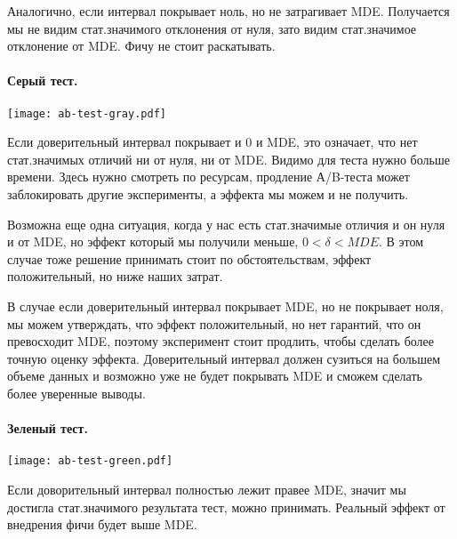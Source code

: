 \documentclass[../handbook.tex]{subfiles}
\begin{document}
Аналогично, если интервал покрывает ноль, но не затрагивает MDE. Получается мы
не видим стат.значимого отклонения от нуля, зато видим стат.значимое отклонение
от MDE. Фичу не стоит раскатывать.

\paragraph{Серый тест.}
\begin{marginfigure}
    \texttt{[image: ab-test-gray.pdf]}
\end{marginfigure}
Если доверительный интервал покрывает и 0 и MDE, это означает, что нет
стат.значимых отличий ни от нуля, ни от MDE. Видимо для теста нужно больше
времени. Здесь нужно смотреть по ресурсам, продление А/B-теста может
заблокировать другие эксперименты, а эффекта мы можем и не получить.

Возможна еще одна ситуация, когда у нас есть стат.значимые отличия и он нуля и
от MDE, но эффект который мы получили меньше, $0 < \delta < MDE$. В этом случае
тоже решение принимать стоит по обстоятельствам, эффект положительный, но ниже
наших затрат.

В случае если доверительный интервал покрывает MDE, но не покрывает ноля, мы
можем утверждать, что эффект положительный, но нет гарантий, что он превосходит
MDE, поэтому эксперимент стоит продлить, чтобы сделать более точную оценку
эффекта. Доверительный интервал должен сузиться на большем объеме данных и
возможно уже не будет покрывать MDE и сможем сделать более уверенные выводы.

\paragraph{Зеленый тест.}
\begin{marginfigure}
    \texttt{[image: ab-test-green.pdf]}
\end{marginfigure}
Если доворительный интервал полностью лежит правее MDE, значит мы достигла стат.значимого результата тест, можно принимать. Реальный эффект от внедрения фичи будет выше MDE.
\end{document}
